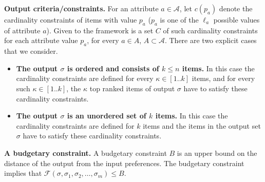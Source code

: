 \documentclass[11pt]{article}
\begin{document}
\vspace{-0.1in}
\begin{definition}\label{def1}
\vspace{-0.1in}
{\bf Output criteria/constraints.}  For an attribute $a\in \mathcal{A}$,  let $c(p_a)$ denote the cardinality constraints of items with value $p_a$ ($p_a$ is one of the $\ell_a$ possible values of attribute $a$). Given to the framework is a set $C$ of such cardinality constraints for each attribute value $p_a$, for every $a \in A$, $A \subset \mathcal{A}$. There are two explicit cases that we consider.
\begin{itemize}
    \item {\bf The output $\sigma$ is ordered and consists of $k\le n$ items.} 
    In this case the cardinality constraints are defined for every $\kappa \in [1..k]$ items, and for every  such $\kappa \in [1..k]$, the $\kappa$ top ranked items of output $\sigma$ have to satisfy these cardinality constraints.  
     \item {\bf The output $\sigma$ is an unordered set of $k$ items.} In this case the cardinality constraints are defined for $k$ items and the items in the output set $\sigma$ have to satisfy these cardinality constraints. 
     \\ %
\end{itemize}  
\end{definition}
\vspace{-0.1in}
\begin{definition}\label{def3}
\vspace{-0.1in}
{\bf A budgetary constraint.} A budgetary constraint $B$ is an upper bound on the distance of the output from the input preferences. 
The budgetary constraint implies that $\mathcal{F}(\sigma,\sigma_1,\sigma_2,\ldots,\sigma_m)\leq B$.  
\end{definition}
\end{document}
